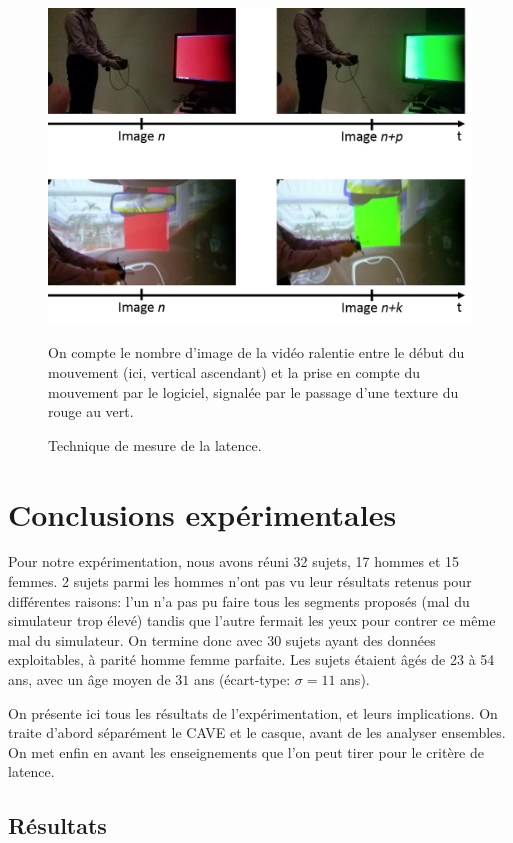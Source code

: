 	\begin{figure}
		\centering
		\includegraphics[scale=.8]{Figures/LatencyMeasureTechnique}
		\caption{Technique de mesure de la latence.}{On compte le nombre d'image de la vidéo ralentie entre le début du mouvement (ici, vertical ascendant) et la prise en compte du mouvement par le logiciel, signalée par le passage d'une texture du rouge au vert.}
		\label{fig:mesure_latence_video}
	\end{figure}
	
\chapter{Conclusions expérimentales}
	\par Pour notre expérimentation, nous avons réuni 32 sujets, 17 hommes et 15 femmes. 2 sujets parmi les hommes n'ont pas vu leur résultats retenus pour différentes raisons: l'un n'a pas pu faire tous les segments proposés (mal du simulateur trop élevé) tandis que l'autre fermait les yeux pour contrer ce même mal du simulateur. On termine donc avec 30 sujets ayant des données exploitables, à parité homme femme parfaite. Les sujets étaient âgés de 23 à 54 ans, avec un âge moyen de $31$ ans (écart-type: $\sigma = 11$ ans).
	
	\par On présente ici tous les résultats de l'expérimentation, et leurs implications. On traite d'abord séparément le CAVE et le casque, avant de les analyser ensembles. On met enfin en avant les enseignements que l'on peut tirer pour le critère de latence.
	
	\section{Résultats}
